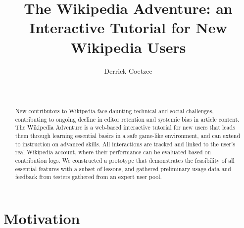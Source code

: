 \documentclass{acm_proc_article-sp}
\begin{document}
\title{The Wikipedia Adventure: an Interactive Tutorial for New Wikipedia Users}

\author{
\alignauthor
Derrick Coetzee \\
       \\
       \\
}

\maketitle

\begin{abstract}
New contributors to Wikipedia face daunting technical and social challenges, contributing to ongoing decline in editor retention and systemic bias in article content. The Wikipedia Adventure is a web-based interactive tutorial for new users that leads them through learning essential basics in a safe game-like environment, and can extend to instruction on advanced skills. All interactions are tracked and linked to the user's real Wikipedia account, where their performance can be evaluated based on contribution logs. We constructed a prototype that demonstrates the feasibility of all essential features with a subset of lessons, and gathered preliminary usage data and feedback from testers gathered from an expert user pool.
\end{abstract}


\section{Motivation}
\end{document}
